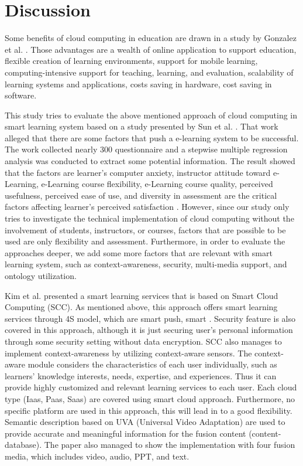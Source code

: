 \documentclass[journal]{vgtc}
\begin{document}
\section{Discussion}
Some benefits of cloud computing in education are drawn in a study by Gonzalez et al. \cite{Gonzalez-Martinez2014}. Those advantages are a wealth of online application to support education, flexible creation of learning environments, support for mobile learning, computing-intensive support for teaching, learning, and evaluation, scalability of learning systems and applications, costs saving in hardware, cost saving in software.

This study tries to evaluate the above mentioned approach of cloud computing in smart learning system based on a study presented by Sun et al. \cite{Sun2008}. That work alleged that there are some factors that push a e-learning system to be successful. The work collected nearly 300 questionnaire and a stepwise multiple regression analysis was conducted to extract some potential information. The result showed that the factors are learner's computer anxiety, instructor attitude toward e-Learning, e-Learning course flexibility, e-Learning course quality, perceived usefulness, perceived ease of use, and diversity in assessment are the critical factors affecting learner's perceived satisfaction \cite{Sun2008}. However, since our study only tries to investigate the technical implementation of cloud computing without the involvement of students, instructors, or courses, factors that are possible to be used are only flexibility and assessment. Furthermore, in order to evaluate the approaches deeper, we add some more factors that are relevant with smart learning system, such as context-awareness, security, multi-media support, and ontology utilization.

Kim et al. presented a smart learning services that is based on Smart Cloud Computing (SCC). As mentioned above, this approach offers smart learning services through 4S model, which are smart push, smart . Security feature is also covered in this approach, although it is just securing user's personal information through some security setting without data encryption. SCC also manages to implement context-awareness by utilizing context-aware sensors. The context-aware module considers the characteristics of each user individually, such as learners' knowledge interests, needs, expertise, and experiences. Thus it can provide highly customized and relevant learning services to each user. Each cloud type (Iaas, Paas, Saas) are covered using smart cloud approach. Furthermore, no specific platform are used in this approach, this will lead in to a good flexibility. Semantic description based on UVA (Universal Video Adaptation) are used to provide accurate and meaningful information for the fusion content (content-database). The paper also managed to show the implementation with four fusion media, which includes video, audio, PPT, and text.
\end{document}

